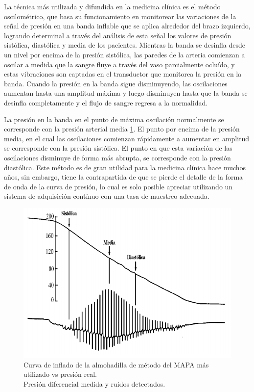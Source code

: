 La técnica más utilizada y difundida en la medicina clínica es el método oscilométrico, que basa su funcionamiento en monitorear las variaciones de la señal de presión en una banda inflable que se aplica alrededor del brazo izquierdo, logrando determinal a través del análisis de esta señal los valores de presión sistólica, diastólica y media de los pacientes. Mientras la banda se desinfla desde un nivel por encima de la presión sistólica, las paredes de la arteria comienzan a oscilar a medida que la sangre fluye a través del vaso parcialmente ocluído, y estas vibraciones son captadas en el transductor que monitorea la presión en la banda. Cuando la presión en la banda sigue disminuyendo, las oscilaciones aumentan hasta una amplitud máxima y luego disminuyen  hasta que la banda se desinfla completamente y el flujo de sangre regresa a la normalidad.

La presión en la banda en el punto de máxima oscilación normalmente se corresponde con la presión arterial media \ref{fig:moscilometrico}. El punto por encima de la presión media, en el cual las oscilaciones comienzan rápidamente a aumentar en amplitud se corresponde con la presión sistólica. El punto en que esta variación de las oscilaciones disminuye de forma más abrupta, se corresponde con la presión diastólica. Este método es de gran utilidad para la medicina clínica hace muchos años, sin embargo, tiene la contrapartida de que se pierde el detalle de la forma de onda de la curva de presión, lo cual es solo posible apreciar utilizando un sistema de adquisición contínuo con una tasa de muestreo adecuada.


\begin{figure}[!htbp]
	\centering
	\includegraphics[width=\textwidth]{./Figures/moscilometrico.png}
	\caption{Curva de inflado de la almohadilla de método del MAPA más utilizado vs presión real.\\ Presión diferencial medida y ruidos detectados.}
	\label{fig:moscilometrico}
\end{figure}

